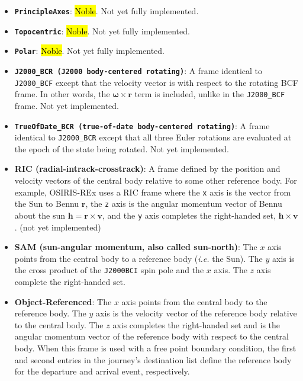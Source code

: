 \begin{itemize}
	\item \textbf{\texttt{PrincipleAxes}}: \hl{Noble}. Not yet fully implemented.
	
	\item \textbf{\texttt{Topocentric}}: \hl{Noble}. Not yet fully implemented.

	\item \textbf{\texttt{Polar}}: \hl{Noble}. Not yet fully implemented.
	
	\item \textbf{\texttt{J2000\_BCR (J2000 body-centered rotating)}}: A frame identical to \texttt{J2000\_BCF} except that the velocity vector is with respect to the rotating BCF frame. In other words, the $\mathbf{\omega} \times \mathbf{r}$ term is included, unlike in the \texttt{J2000\_BCF} frame. Not yet implemented.
	
	\item \textbf{\texttt{TrueOfDate\_BCR (true-of-date body-centered rotating)}}: A frame identical to \texttt{J2000\_BCR} except that all three Euler rotations are evaluated at the epoch of the state being rotated. Not yet implemented.
	
	\item \textbf{RIC (radial-intrack-crosstrack)}: A frame defined by the position and velocity vectors of the central body relative to some other reference body. For example, OSIRIS-REx uses a RIC frame where the \texttt{x} axis is the vector from the Sun to Bennu $\mathbf{r}$, the \texttt{z} axis is the angular momentum vector of Bennu about the sun $\mathbf{h} = \mathbf{r} \times \mathbf{v}$, and the \texttt{y} axis completes the right-handed set, $\mathbf{h} \times \mathbf{v}$. (not yet implemented)
	
	\item \textbf{SAM (sun-angular momentum, also called sun-north)}: The $x$ axis points from the central body to a reference body (\textit{i.e.} the Sun). The $y$ axis is the cross product of the \texttt{J2000BCI} spin pole and the $x$ axis. The $z$ axis complete the right-handed set.
	
	\item \textbf{Object-Referenced}: The $x$ axis points from the central body to the reference body. The $y$ axis is the velocity vector of the reference body relative to the central body. The $z$ axis completes the right-handed set and is the angular momentum vector of the reference body with respect to the central body. When this frame is used with a free point boundary condition, the first and second entries in the journey's destination list define the reference body for the departure and arrival event, respectively.
\end{itemize}

